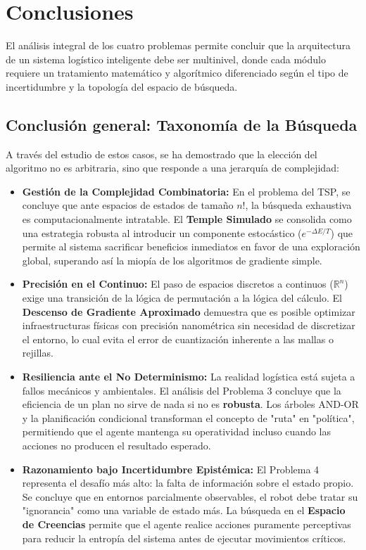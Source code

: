 \section{Conclusiones}

El análisis integral de los cuatro problemas permite concluir que la arquitectura de un sistema logístico inteligente debe ser multinivel, donde cada módulo requiere un tratamiento matemático y algorítmico diferenciado según el tipo de incertidumbre y la topología del espacio de búsqueda.

\subsection{Conclusión general: Taxonomía de la Búsqueda}

A través del estudio de estos casos, se ha demostrado que la elección del algoritmo no es arbitraria, sino que responde a una jerarquía de complejidad:

\begin{itemize}
    \item \textbf{Gestión de la Complejidad Combinatoria:} En el problema del TSP, se concluye que ante espacios de estados de tamaño $n!$, la búsqueda exhaustiva es computacionalmente intratable. El \textbf{Temple Simulado} se consolida como una estrategia robusta al introducir un componente estocástico ($e^{-\Delta E / T}$) que permite al sistema sacrificar beneficios inmediatos en favor de una exploración global, superando así la miopía de los algoritmos de gradiente simple.
    
    \item \textbf{Precisión en el Continuo:} El paso de espacios discretos a continuos ($\mathbb{R}^n$) exige una transición de la lógica de permutación a la lógica del cálculo. El \textbf{Descenso de Gradiente Aproximado} demuestra que es posible optimizar infraestructuras físicas con precisión nanométrica sin necesidad de discretizar el entorno, lo cual evita el error de cuantización inherente a las mallas o rejillas.
    
    \item \textbf{Resiliencia ante el No Determinismo:} La realidad logística está sujeta a fallos mecánicos y ambientales. El análisis del Problema 3 concluye que la eficiencia de un plan no sirve de nada si no es \textbf{robusta}. Los árboles AND-OR y la planificación condicional transforman el concepto de "ruta" en "política", permitiendo que el agente mantenga su operatividad incluso cuando las acciones no producen el resultado esperado.
    
    \item \textbf{Razonamiento bajo Incertidumbre Epistémica:} El Problema 4 representa el desafío más alto: la falta de información sobre el estado propio. Se concluye que en entornos parcialmente observables, el robot debe tratar su "ignorancia" como una variable de estado más. La búsqueda en el \textbf{Espacio de Creencias} permite que el agente realice acciones puramente perceptivas para reducir la entropía del sistema antes de ejecutar movimientos críticos.
\end{itemize}

